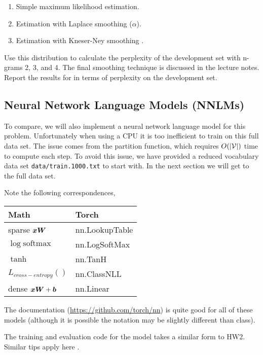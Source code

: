 \documentclass[11pt]{article}
\begin{document}
\begin{enumerate}
\item Simple maximum likelihood estimation. 
\item Estimation with Laplace smoothing ($\alpha$).
\item Estimation with Kneser-Ney smoothing \cite{kneser1995improved}. 
\end{enumerate}

Use this distribution to calculate the perplexity of the development
set with n-grams 2, 3, and 4. The final smoothing technique is
discussed in the lecture notes. Report the results for in terms of
perplexity on the development set.

\subsection{Neural Network Language Models (NNLMs)}

To compare, we will also implement a neural network language model for
this problem. Unfortunately when using a CPU it is too inefficient to
train on this full data set. The issue comes from the partition
function, which requires $O(|\mathcal{V}|)$ time to compute each step. To
avoid this issue, we have provided a reduced vocabulary data set
\texttt{data/train.1000.txt} to start with. In the next section we 
will get to the full data set.

Note the following correspondences,

\begin{center}
  \begin{tabular}{ll}
    \toprule
    Math & Torch \\
    \midrule 
    sparse $\boldsymbol{x} \boldsymbol{W}$ & nn.LookupTable \\ 
    $\log \mathrm{softmax}$ & nn.LogSoftMax \\ 
    $\tanh $ & nn.TanH \\ 
    $L_{cross-entropy}()$ & nn.ClassNLL \\ 
    dense $\boldsymbol{x} \boldsymbol{W} + \boldsymbol{b}$ & nn.Linear \\ 
    \bottomrule
  \end{tabular}
\end{center}
The documentation (\url{https://github.com/torch/nn}) is quite good
for all of these models (although it is possible the notation may be
slightly different than class).

The training and evaluation code for the model takes a similar form to
HW2. Similar tips apply here .
 
\end{document}
